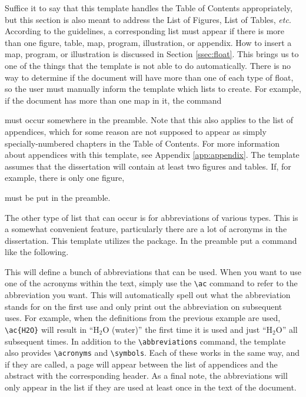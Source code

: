 Suffice it to say that this template handles the Table of Contents
appropriately, but this section is also meant to address the List of
Figures, List of Tables, \textit{etc}.  According to the guidelines,
a corresponding list must appear if there is more than one figure,
table, map, program, illustration, or appendix.  How to insert a map,
program, or illustration is discussed in Section \ref{ssec:float}.  This
brings us to one of the things that the template is not able to do
automatically.  There is no way to determine if the document will have
more than one of each type of float, so the user must manually inform
the template which lists to create.  For example, if the document has
more than one map in it, the command
\begin{code}
\showlistofmaps
\end{code}
must occur somewhere in the preamble.  Note that this also applies to
the list of appendices, which for some reason are not supposed to
appear as simply specially-numbered chapters in the Table of Contents.
For more information about appendices with this template, see Appendix
\ref{app:appendix}.  The template assumes that the dissertation will
contain at least two figures and tables.  If, for example, there is only
one figure,
\begin{code}
\hidelistoffigures
\end{code}
must be put in the preamble.

The other type of list that can occur is for abbreviations of various
types.  This is a somewhat convenient feature, particularly there are a
lot of acronyms in the dissertation.  This template utilizes the
 package.  In the preamble put a command like the
following.
\begin{code}
\end{code}
This will define a bunch of abbreviations that can be used.  When you
want to use one of the acronyms within the text, simply use the
\verb|\ac| command to refer to the abbreviation you want.  This will
automatically spell out what the abbreviation stands for on the first
use and only print out the abbreviation on subsequent uses.  For
example, when the definitions from the previous example are used,
\verb|\ac{H2O}| will result in ``$\mathrm{H_2O}$ (water)'' the first
time it is used and just ``$\mathrm{H_2O}$'' all subsequent times.  In
addition to the \verb|\abbreviations| command, the template also
provides \verb|\acronyms| and \verb|\symbols|.  Each of these works in
the same way, and if they are called, a page will appear between the
list of appendices and the abstract with the corresponding header.  As a
final note, the abbreviations will only appear in the list if they are
used at least once in the text of the document.

